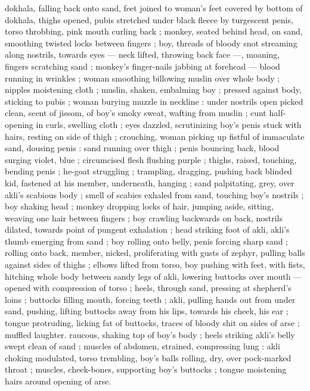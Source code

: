 {dokhala, falling back onto sand, feet joined to woman's feet covered 
by bottom of dokhala, thighs opened, pubis stretched under black 
fleece by turgescent penis, torso throbbing, pink mouth curling back 
; monkey, seated behind head, on sand, smoothing twisted locks 
between fingers ; boy, threads of bloody snot streaming along 
nostrils, towards eyes --- neck lifted, throwing back face ---, 
moaning, fingers scratching sand ; monkey's finger-nails jabbing at 
forehead --- blood running in wrinkles ; woman smoothing billowing 
muslin over whole body ; nipples moistening cloth ; muslin, shaken, 
embalming boy ; pressed against body, sticking to pubis ; woman 
burying muzzle in neckline : under nostrils open picked clean, scent 
of jissom, of boy's smoky sweat, wafting from muslin ; cunt half- 
opening in curls, swelling cloth ; eyes dazzled, scrutinizing boy's 
penis stuck with hairs, resting on side of thigh ; crouching, woman 
picking up fistful of immaculate sand, dousing penis : sand running 
over thigh ; penis bouncing back, blood surging violet, blue ; 
circumcised flesh flushing purple ; thighs, raised, touching, bending 
penis ; he-goat struggling ; trampling, dragging, pushing back 
blinded kid, fastened at his member, underneath, hanging ; sand 
palpitating, grey, over akli's scabious body ; smell of scabies exhaled 
from sand, touching boy's nostrils ; boy shaking head ; monkey 
dropping locks of hair, jumping aside, sitting, weaving one hair 
between fingers ; boy crawling backwards on back, nostrils dilated, 
towards point of pungent exhalation ; head striking foot of akli, akli's 
thumb emerging from sand ; boy rolling onto belly, penis forcing 
sharp sand ; rolling onto back, member, nicked, proliferating with 
gusts of zephyr, pulling balls against sides of thighs ; elbows lifted 
from torso, boy pushing with feet, with fists, hitching whole body 
between sandy legs of akli, lowering buttocks over mouth --- opened 
with compression of torso ; heels, through sand, pressing at 
shepherd's loins ; buttocks filling mouth, forcing teeth ; akli, pulling 
hands out from under sand, pushing, lifting buttocks away from his 
lips, towards his cheek, his ear ; tongue protruding, licking fat of 
buttocks, traces of bloody shit on sides of arse ; muffled laughter. 
raucous, shaking top of boy's body ; heels striking akli's belly swept 
clean of sand ; muscles of abdomen, strained, compressing lung : 
akli choking modulated, torso trembling, boy's balls rolling, dry, over 
pock-marked throat ; muscles, cheek-bones, supporting boy's 
buttocks ; tongue moistening hairs around opening of arse. 
}
